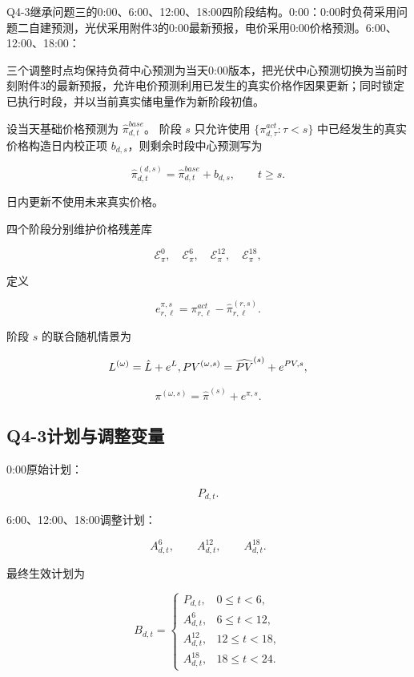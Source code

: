 Q4-3继承问题三的0:00、6:00、12:00、18:00四阶段结构。0:00：0:00时负荷采用问题二自建预测，光伏采用附件3的0:00最新预报，电价采用0:00价格预测。6:00、12:00、18:00：

三个调整时点均保持负荷中心预测为当天0:00版本，把光伏中心预测切换为当前时刻附件3的最新预报，允许电价预测利用已发生的真实价格作因果更新；同时锁定已执行时段，并以当前真实储电量作为新阶段初值。

设当天基础价格预测为 \(\hat\pi_{d,t}^{base}\)。 阶段 \(s\) 只允许使用 \(\{\pi^{act}_{d,\tau}:\tau<s\}\) 中已经发生的真实价格构造日内校正项 \(b_{d,s}\)，则剩余时段中心预测写为

\begin{equation}
\hat\pi_{d,t}^{(d,s)}
=
\hat\pi_{d,t}^{base}
+
b_{d,s},
\qquad
t\ge s.
\end{equation}

日内更新不使用未来真实价格。

四个阶段分别维护价格残差库

\[
\mathcal E_\pi^0,\quad
\mathcal E_\pi^6,\quad
\mathcal E_\pi^{12},\quad
\mathcal E_\pi^{18},
\]

定义

\begin{equation}
e^{\pi,s}_{r,\ell}
=
\pi^{act}_{r,\ell}
-
\hat\pi^{(r,s)}_{r,\ell}.
\end{equation}

阶段 \(s\) 的联合随机情景为

\[
L^{(\omega)}
=
\hat L+e^L,\\
PV^{(\omega,s)}
=
\widehat{PV}^{(s)}
+
e^{PV,s},
\]

\begin{equation}
\pi^{(\omega,s)}
=
\hat\pi^{(s)}
+
e^{\pi,s}.
\end{equation}

\subsection{Q4-3计划与调整变量}

0:00原始计划：

\[
P_{d,t}.
\]

6:00、12:00、18:00调整计划：

\[
A^6_{d,t},
\qquad
A^{12}_{d,t},
\qquad
A^{18}_{d,t}.
\]

最终生效计划为

\begin{equation}
B_{d,t}
=
\begin{cases}
P_{d,t},&0\le t<6,\\
A^6_{d,t},&6\le t<12,\\
A^{12}_{d,t},&12\le t<18,\\
A^{18}_{d,t},&18\le t<24.
\end{cases}
\end{equation}

